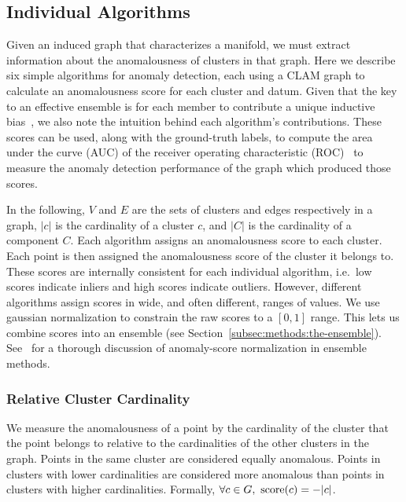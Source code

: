 \subsection{Individual Algorithms}
\label{subsec:methods:individual-algorithms}

Given an induced graph that characterizes a manifold, we must extract information about the anomalousness of clusters in that graph.
Here we describe six simple algorithms for anomaly detection, each using a CLAM graph to calculate an anomalousness score for each cluster and datum.
Given that the key to an effective ensemble is for each member to contribute a unique inductive bias~\cite{chen2017outlier}, we also note the intuition behind each algorithm's contributions.
These scores can be used, along with the ground-truth labels, to compute the area under the curve (AUC) of the receiver operating characteristic (ROC)~\cite{fawcett2006introduction} to measure the anomaly detection performance of the graph which produced those scores.

In the following,
$V$ and $E$ are the sets of clusters and edges respectively in a graph,
$|c|$ is the cardinality of a cluster $c$,
and $|C|$ is the cardinality of a component $C$.
Each algorithm assigns an anomalousness score to each cluster.
Each point is then assigned the anomalousness score of the cluster it belongs to.
These scores are internally consistent for each individual algorithm, i.e.\ low scores indicate inliers and high scores indicate outliers.
However, different algorithms assign scores in wide, and often different, ranges of values.
We use gaussian normalization to constrain the raw scores to a $[0, 1]$ range.
This lets us combine scores into an ensemble (see Section~\ref{subsec:methods:the-ensemble}).
See~\cite{kriegel2011interpreting} for a thorough discussion of anomaly-score normalization in ensemble methods.


\subsubsection{Relative Cluster Cardinality}
\label{subsubsec:methods:individual-algorithms:relative-cluster-cardinality}
We measure the anomalousness of a point by the cardinality of the cluster that the point belongs to relative to the cardinalities of the other clusters in the graph.
Points in the same cluster are considered equally anomalous.
Points in clusters with lower cardinalities are considered more anomalous than points in clusters with higher cardinalities.
Formally, $\forall c \in G, \ \score(c) = -|c|$.

